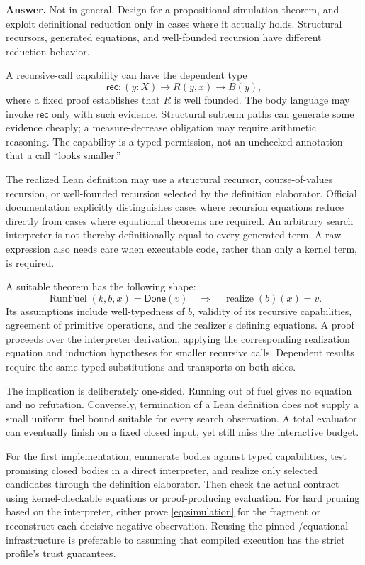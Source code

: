 \documentclass[11pt,a4paper]{article}
\newcommand{\code}[1]{\texttt{\detokenize{#1}}}
\theoremstyle{definition}
\theoremstyle{remark}
\begin{document}
\textbf{Answer.} Not in general. Design for a propositional simulation theorem, and exploit definitional reduction only in cases where it actually holds. Structural recursors, generated equations, and well-founded recursion have different reduction behavior.

A recursive-call capability can have the dependent type
\[
 \mathsf{rec}:(y:X)\to R(y,x)\to B(y),
\]
where a fixed proof establishes that $R$ is well founded. The body language may invoke $\mathsf{rec}$ only with such evidence. Structural subterm paths can generate some evidence cheaply; a measure-decrease obligation may require arithmetic reasoning. The capability is a typed permission, not an unchecked annotation that a call ``looks smaller.''

The realized Lean definition may use a structural recursor, course-of-values recursion, or well-founded recursion selected by the definition elaborator. Official documentation explicitly distinguishes cases where recursion equations reduce directly from cases where equational theorems are required.\cite{lean-recursion} An arbitrary search interpreter is not thereby definitionally equal to every generated term. A raw \code{WellFounded.fix} expression also needs care when executable code, rather than only a kernel term, is required.

A suitable theorem has the following shape:
\begin{equation}\label{eq:simulation}
 \operatorname{RunFuel}(k,b,x)=\mathsf{Done}(v)
 \quad\Longrightarrow\quad
 \operatorname{realize}(b)(x)=v.
\end{equation}
Its assumptions include well-typedness of $b$, validity of its recursive capabilities, agreement of primitive operations, and the realizer's defining equations. A proof proceeds over the interpreter derivation, applying the corresponding realization equation and induction hypotheses for smaller recursive calls. Dependent results require the same typed substitutions and transports on both sides.

The implication is deliberately one-sided. Running out of fuel gives no equation and no refutation. Conversely, termination of a Lean definition does not supply a small uniform fuel bound suitable for every search observation. A total evaluator can eventually finish on a fixed closed input, yet still miss the interactive budget.

For the first implementation, enumerate bodies against typed capabilities, test promising closed bodies in a direct interpreter, and realize only selected candidates through the definition elaborator. Then check the actual contract using kernel-checkable equations or proof-producing evaluation. For hard pruning based on the interpreter, either prove \eqref{eq:simulation} for the fragment or reconstruct each decisive negative observation. Reusing the pinned \code{cbv}/equational infrastructure is preferable to assuming that compiled execution has the strict profile's trust guarantees.\cite{lean-cbv,lean-tactics}
\end{document}
